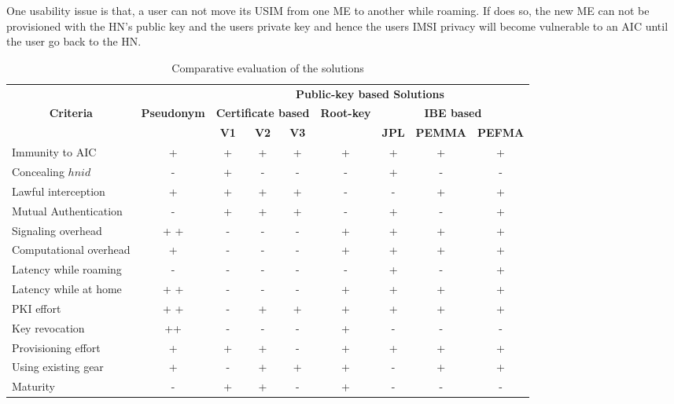 \documentclass{river-journal}
\begin{document}
One usability issue is that, a user can not move its USIM from one ME to another while roaming. If does so, the new ME can not be provisioned with the HN's public key and the users private key and hence the users IMSI privacy will become vulnerable to an AIC until the user go back to the HN.


\begin{table}
\begin{tiny}
 \begin{center}
\caption{Comparative evaluation of the solutions}
\begin{tabular}[t]{|l|c|c|c|c|c|c|c|c|}
\hline
\multicolumn{1}{|c|}{} & \multicolumn{1}{|c|}{} & \multicolumn{7}{|c|}{\textbf{Public-key based Solutions}}\\
\cline{3-9}
\multicolumn{1}{|c|}{\textbf{Criteria}} & \multicolumn{1}{|c|}{\textbf{Pseudonym}} & \multicolumn{3}{|c|}{\textbf{Certificate based}} & \multicolumn{1}{|c|}{\textbf{Root-key}} & \multicolumn{3}{|c|}{\textbf{IBE based}}\\
\cline{3-5} \cline{7-9}
\textbf{} &  & \textbf{V1} & \textbf{V2} & \textbf{V3} & \textbf{} & \textbf{JPL} & \textbf{PEMMA} & \textbf{PEFMA}\\
\hline \hline
Immunity to AIC & + & + & + & + & + & + & + & + \\ \hline
Concealing $hnid$ & - & + & - & - & - & + & - & - \\ \hline
Lawful interception & + & + & + & + & - & - & + & + \\ \hline
Mutual Authentication & - & + & + & + & - & + & - & + \\ \hline
Signaling overhead & + + & - & - & - & + & + & + & + \\ \hline
Computational overhead & + & - & - & - & + & + & + & + \\ \hline
Latency while roaming & - & - & -  & - & - & + & - & + \\ \hline
Latency while at home & + + & - & -  & - & + & + & + & + \\ \hline
PKI effort & + + &  - & + & + & + & + & + & + \\ \hline
Key revocation & ++ & - & - & - & + & - & - & - \\ \hline
Provisioning effort & + & + & + & - & + & + & + & + \\ \hline
Using existing gear & + & - & + & + & + & - & + & + \\ \hline
Maturity  & - & + & + & - & + & - & - & - \\ \hline
\end{tabular}
\label{table:comparison}
\end{center}
\end{tiny}
\end{table}
\end{document}
